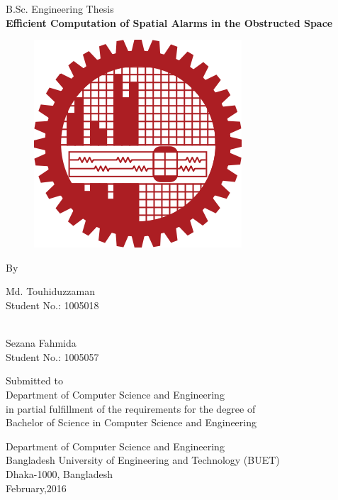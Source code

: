 \thispagestyle{empty}
\vspace{-5cm}
\begin{center}

\large{B.Sc. Engineering Thesis\\
\vspace{1cm}
\Large{{\textbf{Efficient Computation of Spatial Alarms in the Obstructed Space}}}\\


\vspace{0.3cm}

  \vfill

\begin{figure}[!htbp]
\centering
\includegraphics[width=0.2\columnwidth]{buetlogo.png}
\end{figure}

  \vfill

\vspace{0.3cm}

\normalsize{By}\\
\large{



Md. Touhiduzzaman\\
Student No.: 1005018}\\
Sezana Fahmida\\
Student No.: 1005057\\

}

\vspace{1.9cm}


\normalsize{Submitted to \\
Department of Computer Science and Engineering\\
in partial fulfillment of the requirements for the degree of\\
Bachelor of Science in Computer Science and Engineering}\\


\vspace{1.9cm}

\normalsize{Department of Computer Science and Engineering\\
Bangladesh University of Engineering and Technology (BUET) \\
Dhaka-1000, Bangladesh}\\
\vspace{0.4cm}
February,2016

\end{center}

